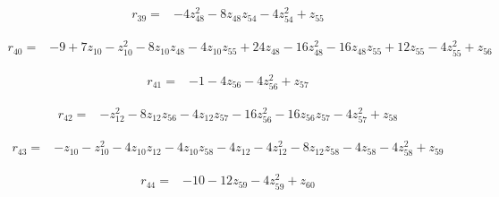 \par\noindent\begin{minipage}{\linewidth}
\begin{align*}
r_{39}={}&-4z_{48}^{2}-8z_{48}z_{54}-4z_{54}^{2}+z_{55}
\end{align*}
\end{minipage}\par
\par\noindent\begin{minipage}{\linewidth}
\begin{align*}
r_{40}={}&-9+7z_{10}-z_{10}^{2}-8z_{10}z_{48}-4z_{10}z_{55}+24z_{48}-16z_{48}^{2}-16z_{48}z_{55}+12z_{55}-4z_{55}^{2}+z_{56}
\end{align*}
\end{minipage}\par
\par\noindent\begin{minipage}{\linewidth}
\begin{align*}
r_{41}={}&-1-4z_{56}-4z_{56}^{2}+z_{57}
\end{align*}
\end{minipage}\par
\par\noindent\begin{minipage}{\linewidth}
\begin{align*}
r_{42}={}&-z_{12}^{2}-8z_{12}z_{56}-4z_{12}z_{57}-16z_{56}^{2}-16z_{56}z_{57}-4z_{57}^{2}+z_{58}
\end{align*}
\end{minipage}\par
\par\noindent\begin{minipage}{\linewidth}
\begin{align*}
r_{43}={}&-z_{10}-z_{10}^{2}-4z_{10}z_{12}-4z_{10}z_{58}-4z_{12}-4z_{12}^{2}-8z_{12}z_{58}-4z_{58}-4z_{58}^{2}+z_{59}
\end{align*}
\end{minipage}\par
\par\noindent\begin{minipage}{\linewidth}
\begin{align*}
r_{44}={}&-10-12z_{59}-4z_{59}^{2}+z_{60}
\end{align*}
\end{minipage}\par

